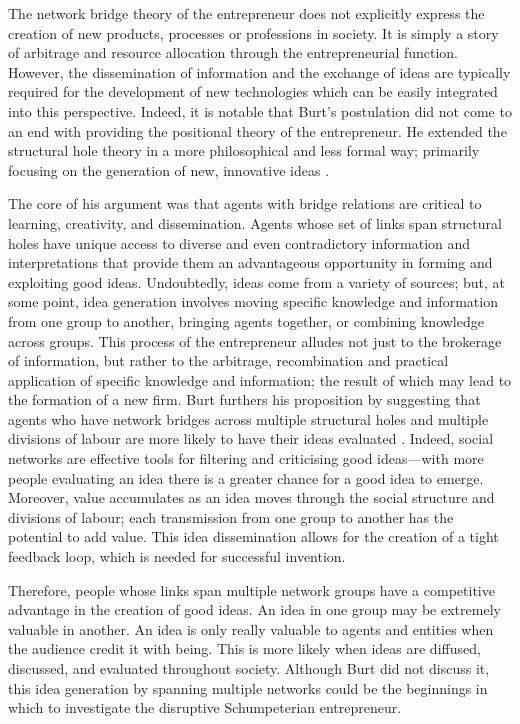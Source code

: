 The network bridge theory of the entrepreneur does not explicitly express the creation of new products, processes or professions in society. It is simply a story of arbitrage and resource allocation through the entrepreneurial function. However, the dissemination of information and the exchange of ideas are typically required for the development of new technologies which can be easily integrated into this perspective. Indeed, it is notable that Burt's postulation did not come to an end with providing the positional theory of the entrepreneur. He extended the structural hole theory in a more philosophical and less formal way; primarily focusing on the generation of new, innovative ideas \citep{Burt2004}.


The core of his argument was that agents with bridge relations are critical to learning, creativity, and dissemination. Agents whose set of links span structural holes have unique access to diverse and even contradictory information and interpretations that provide them an advantageous opportunity in forming and exploiting good ideas. Undoubtedly, ideas come from a variety of sources; but, at some point, idea generation involves moving specific knowledge and information from one group to another, bringing agents together, or combining knowledge across groups. This process of the entrepreneur alludes not just to the brokerage of information, but rather to the arbitrage, recombination and practical application of specific knowledge and information; the result of which may lead to the formation of a new firm. Burt furthers his proposition by suggesting that agents who have network bridges across multiple structural holes and multiple divisions of labour are more likely to have their ideas evaluated \citep{Burt2005}. Indeed, social networks are effective tools for filtering and criticising good ideas---with more people evaluating an idea there is a greater chance for a good idea to emerge. Moreover, value accumulates as an idea moves through the social structure and divisions of labour; each transmission from one group to another has the potential to add value. This idea dissemination allows for the creation of a tight feedback loop, which is needed for successful invention.

Therefore, people whose links span multiple network groups have a competitive advantage in the creation of good ideas. An idea in one group may be extremely valuable in another. An idea is only really valuable to agents and entities when the audience credit it with being. This is more likely when ideas are diffused, discussed, and evaluated throughout society. Although Burt did not discuss it, this idea generation by spanning multiple networks could be the beginnings in which to investigate the disruptive Schumpeterian entrepreneur.

